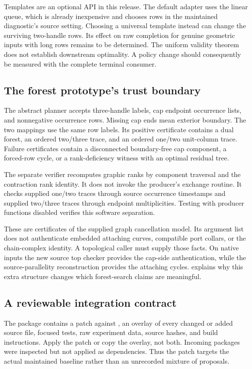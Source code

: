 Templates are an optional API in this release. The default adapter uses the
linear queue, which is already inexpensive and chooses rows in the
maintained diagnostic's source setting. Choosing a universal template
instead can change the surviving two-handle rows. Its effect on raw
completion for genuine geometric inputs with long rows remains to be
determined. The uniform validity theorem does not establish downstream
optimality. A policy change should consequently be measured with the
complete terminal consumer.

\subsection{The forest prototype's trust boundary}

The abstract planner accepts three-handle labels, cap endpoint occurrence
lists, and nonnegative occurrence rows. Missing cap ends mean exterior
boundary. The two mappings use the same row labels. Its positive certificate
contains a dual forest, an ordered two/three trace, and an ordered
one/two unit-column trace. Failure certificates contain a disconnected
boundary-free cap component, a forced-row cycle, or a rank-deficiency
witness with an optimal residual tree.

The separate verifier recomputes graphic ranks by component traversal and
the contraction rank identity. It does not invoke the producer's exchange
routine. It checks supplied one/two traces through source occurrence
timestamps and supplied two/three traces through endpoint multiplicities.
Testing with producer functions disabled verifies this software separation.

These are certificates of the supplied graph cancellation model. Its
argument list does not authenticate embedded attaching curves, compatible
port collars, or the chain-complex identity. A topological caller must
supply those facts. On native inputs the new source top checker provides
the cap-side authentication, while the source-parallelity reconstruction
provides the attaching cycles.  explains why this extra
structure changes which forest-search claims are meaningful.

\subsection{A reviewable integration contract}

The package contains a patch against \sourcecommit, an overlay of every
changed or added source file, focused tests, raw experiment data, source
hashes, and build instructions. Apply the patch or copy the overlay, not
both. Incoming packages were inspected but not applied as dependencies.
Thus the patch targets the actual maintained baseline rather than an
unrecorded mixture of proposals.

